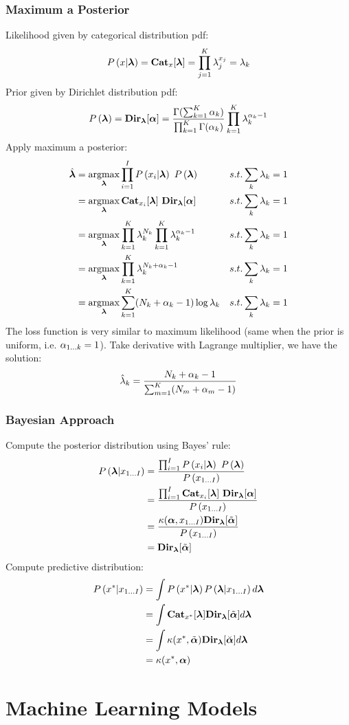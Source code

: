 \subsubsection*{Maximum a Posterior}
Likelihood given by categorical distribution pdf:
	\begin{align*}
	P\left(x|\boldsymbol{\lambda}\right)=\mathbf{Cat}_x[\boldsymbol{\lambda}]=\prod_{j=1}^K\lambda_j^{x_j}=\lambda_k
	\end{align*}
Prior given by Dirichlet distribution pdf:
	\begin{align*}
	P\left(\boldsymbol{\lambda}\right)=\mathbf{Dir}_{\boldsymbol{\lambda}}[\boldsymbol{\alpha}]=\frac{\Gamma(\sum_{k=1}^K\alpha_k)}{\prod_{k=1}^K\Gamma(\alpha_k)}\prod_{k=1}^K\lambda_k^{\alpha_k-1}
	\end{align*}
Apply maximum a posterior:
	\begin{align*}
	\hat{\vec{\la}}&=\argmax_{\vec{\la}}\prod_{i=1}^I\P{x_i|\vec{\la}}\ \P{\vec{\la}} && \text{$s.t. \sum_k\la_k=1$} \\
	&=\argmax_{\vec{\la}}\Cat_{x_i}[\vec{\la}]\ \Dir_{\vec{\la}}[\vec{\al}] && \text{$s.t. \sum_k\la_k=1$} \\
	&=\argmax_{\vec{\la}}\prod_{k=1}^K\la_k^{N_k}\prod_{k=1}^K\la_k^{\al_k-1} && \text{$s.t. \sum_k\la_k=1$} \\
	&=\argmax_{\vec{\la}}\prod_{k=1}^K\la_k^{N_k+\al_k-1} && \text{$s.t. \sum_k\la_k=1$} \\
	&=\argmax_{\vec{\la}}\sum_{k=1}^K(N_k+\al_k-1)\log\la_k && \text{$s.t. \sum_k\la_k=1$}
	\end{align*}
The loss function is very similar to maximum likelihood (same when the prior is uniform, i.e. $\alpha_{1\dots k}=1$). Take derivative with Lagrange multiplier, we have the solution:
	\begin{align*}
	\hat{\lambda}_k=\frac{N_k+\alpha_k-1}{\sum_{m=1}^K(N_m+\alpha_m-1)}
	\end{align*}

\subsubsection*{Bayesian Approach}
Compute the posterior distribution using Bayes' rule:
	\begin{align*}
	\P{\vec{\la}|x_{1\dots I}}&=\frac{\prod_{i=1}^I\P{x_i|\vec{\la}}\ \P{\vec{\la}}}{\P{x_{1\dots I}}} \\
	&=\frac{\prod_{i=1}^I\Cat_{x_i}[\vec{\la}]\ \Dir_{\vec{\la}}[\vec{\al}]}{\P{x_{1\dots I}}} \\
	&=\frac{\ka(\vec{\al},x_{1\dots I})\Dir_{\vec{\la}}[\ti{\vec{\al}}]}{\P{x_{1\dots I}}} \\
	&=\Dir_{\vec{\la}}[\ti{\vec{\al}}]
	\end{align*}
Compute predictive distribution:
	\begin{align*}
	P\left(x^*|x_{1\dots I}\right)&=\int P\left(x^*|\boldsymbol{\lambda}\right)P\left(\boldsymbol{\lambda}|x_{1\dots I}\right)d\boldsymbol{\lambda} \\
	&=\int\mathbf{Cat}_{x^*}[\boldsymbol{\lambda}]\mathbf{Dir}_{\boldsymbol{\lambda}}[\tilde{\boldsymbol{\alpha}}]d\boldsymbol{\lambda} \\
	&=\int\kappa(x^*,\tilde{\boldsymbol{\alpha}})\mathbf{Dir}_{\boldsymbol{\lambda}}[\breve{\boldsymbol{\alpha}}]d\boldsymbol{\lambda} \\
	&=\kappa(x^*,\boldsymbol{\alpha})
	\end{align*}

\section{Machine Learning Models}